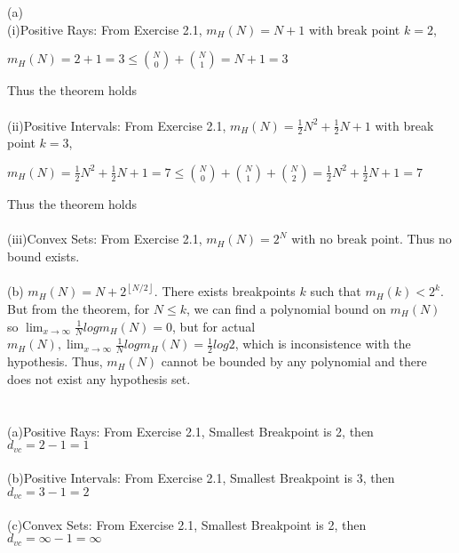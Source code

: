 \documentclass[12pt]{article}
\begin{document}
 \\\\
\indent (a) \\
\indent (i)Positive Rays: From Exercise 2.1, $m_H(N) = N+1$ with break point $k = 2$, 
\begin{center}
$m_H(N) = 2+1 = 3 \leq {N\choose 0} + {N\choose 1} = N+1 = 3$\\
\end{center}
Thus the theorem holds\\\\
\indent (ii)Positive Intervals: From Exercise 2.1, $m_H(N) =  \frac{1}{2} N^2+\frac{1}{2} N+1 $ with break point $k = 3$, 
\begin{center}
$m_H(N) =  \frac{1}{2} N^2+\frac{1}{2} N+1 = 7 \leq {N\choose 0} + {N\choose 1} + {N\choose 2}=  \frac{1}{2} N^2+\frac{1}{2} N+1 = 7$\\
\end{center}
Thus the theorem holds\\\\
\indent (iii)Convex Sets: From Exercise 2.1, $m_H(N) =  2^N$ with no break point. Thus no bound exists.\\\\
\indent (b) $m_H(N) = N+2^{\left \lfloor{N/2}\right \rfloor}$. There exists breakpoints $k$ such that $m_H(k) < 2^k$. But from the theorem, for $N \leq k$, we can find a polynomial bound on $m_H(N)$ so $\lim_{x\to\infty} \frac{1}{N}log m_H(N) = 0$, but for actual $m_H(N), \lim_{x\to\infty} \frac{1}{N}log m_H(N) = \frac{1}{2} log 2$, which is inconsistence with the hypothesis. Thus, $m_H(N)$ cannot be bounded by any polynomial and there does not exist any hypothesis set. \\

 \\\\
\indent(a)Positive Rays: From Exercise 2.1, Smallest Breakpoint is 2, then $d_{vc} = 2 - 1 = 1$\\\\
\indent(b)Positive Intervals: From Exercise 2.1, Smallest Breakpoint is 3, then $d_{vc} = 3 - 1 = 2$\\\\
\indent(c)Convex Sets: From Exercise 2.1, Smallest Breakpoint is 2, then $d_{vc} = \infty - 1 = \infty$\\\\
\end{document}
